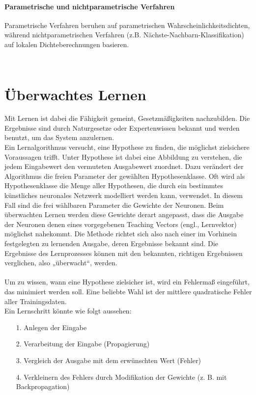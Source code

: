 \subsubsection{Parametrische und nichtparametrische Verfahren}
Parametrische Verfahren beruhen auf parametrischen Wahrscheinlichkeitsdichten, während nichtparametrischen Verfahren (z.B. Nächste-Nachbarn-Klassifikation) auf lokalen Dichteberechnungen basieren.

\

\chapter{Überwachtes Lernen}
Mit Lernen ist dabei die Fähigkeit gemeint, Gesetzmäßigkeiten nachzubilden.
Die Ergebnisse sind durch Naturgesetze oder Expertenwissen bekannt und werden benutzt,
um das System anzulernen.
\\
Ein Lernalgorithmus versucht, eine Hypothese zu finden, die möglichst zielsichere Voraussagen trifft. Unter Hypothese ist dabei eine Abbildung zu verstehen, die jedem Eingabewert den vermuteten Ausgabewert zuordnet. Dazu verändert der Algorithmus die freien Parameter der gewählten Hypothesenklasse. Oft wird als Hypothesenklasse die Menge aller Hypothesen, die durch ein bestimmtes künstliches neuronales Netzwerk modelliert werden kann, verwendet. In diesem Fall sind die frei wählbaren Parameter die Gewichte der Neuronen. Beim überwachten Lernen werden diese Gewichte derart angepasst, dass die Ausgabe der Neuronen denen eines vorgegebenen Teaching Vectors (engl., Lernvektor) möglichst nahekommt. Die Methode richtet sich also nach einer im Vorhinein festgelegten zu lernenden Ausgabe, deren Ergebnisse bekannt sind. Die Ergebnisse des Lernprozesses können mit den bekannten, richtigen Ergebnissen verglichen, also „überwacht“, werden. \\
\\
Um zu wissen, wann eine Hypothese zielsicher ist, wird ein Fehlermaß eingeführt, das minimiert werden soll. Eine beliebte Wahl ist der mittlere quadratische Fehler aller Trainingsdaten.\\
Ein Lernschritt könnte wie folgt aussehen:\\
\begin{itemize}
\item[1.] Anlegen der Eingabe
\item[2.] Verarbeitung der Eingabe (Propagierung)
\item[3.] Vergleich der Ausgabe mit dem erwünschten Wert (Fehler)
\item[4.] Verkleinern des Fehlers durch Modifikation der Gewichte (z. B. mit Backpropagation)
\end{itemize}
